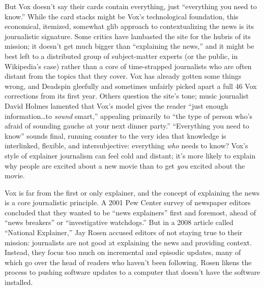 But Vox doesn't say their cards contain everything, just ``everything you need to know.'' While the card stacks might be Vox's technological foundation, this economical, itemized, somewhat glib approach to contextualizing the news is its journalistic signature. Some critics have lambasted the site for the hubris of its mission; it doesn't get much bigger than ``explaining the news,'' and it might be best left to a distributed group of subject-matter experts (or the public, in Wikipedia's case) rather than a core of time-strapped journalists who are often distant from the topics that they cover. Vox has already gotten some things wrong, and Deadspin gleefully and sometimes unfairly picked apart a full 46 Vox corrections from its first year.\autocite{draper_46_2014} Others question the site's tone; music journalist David Holmes lamented that Vox's model gives the reader ``just enough information\ldots to \emph{sound} smart,'' appealing primarily to ``the type of person who's afraid of sounding gauche at your next dinner party.''\autocite{homes_how_2015} ``Everything you need to know'' sounds final, running counter to the very idea that knowledge is interlinked, flexible, and intersubjective: everything \emph{who} needs to know? Vox's style of explainer journalism can feel cold and distant; it's more likely to explain why people are excited about a new movie than to get \emph{you} excited about the movie.

Vox is far from the first or only explainer, and the concept of explaining the news is a core journalistic principle. A 2001 Pew Center survey of newspaper editors concluded that they wanted to be ``news explainers'' first and foremost, ahead of ``news breakers'' or ``investigative watchdogs.''\autocite{????_journalism_2001} But in a 2008 article called ``National Explainer,'' Jay Rosen accused editors of not staying true to their mission: journalists are not good at explaining the news and providing context.\autocite{rosen_national_2008} Instead, they focus too much on incremental and episodic updates, many of which go over the head of readers who haven't been following. Rosen likens the process to pushing software updates to a computer that doesn't have the software installed.

